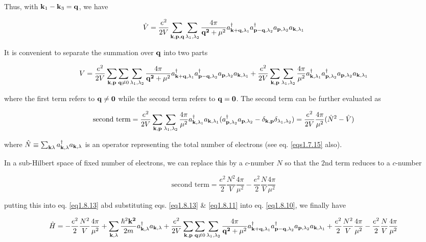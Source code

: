 Thus, with ${\bf k}_1 - {\bf k}_3 = \bf q$, we have

\begin{align}
\hat{V}=\frac{e^2}{2V}\sum_{\bf k,p,q}\sum_{\lambda_1,\lambda_2}\frac{4\pi}{{\bf q^2}+\mu^2}a^\dagger_{{\bf k+q},\lambda_1}a^\dagger_{{\bf p-q},\lambda_2}a_{{\bf p},\lambda_2}a_{{\bf k},\lambda_1}
\end{align}

It is convenient to separate the summation over $\bf q$ into two parts

\begin{align}\label{eq1.8.13}
V=\frac{e^2}{2V}\sum_{\bf k,p}\sum_{{\bf q}\neq0}\sum_{\lambda_1,\lambda_2}\frac{4\pi}{{\bf q^2}+\mu^2}a^\dagger_{{\bf k+q},\lambda_1}a^\dagger_{{\bf p-q},\lambda_2}a_{{\bf p},\lambda_2}a_{{\bf k},\lambda_1} + \frac{e^2}{2V}\sum_{\bf k,p}\sum_{\lambda_1,\lambda_2}\frac{4\pi}{\mu^2}a^\dagger_{{\bf k},\lambda_1}a^\dagger_{{\bf p},\lambda_2}a_{{\bf p},\lambda_2}a_{{\bf k},\lambda_1}
\end{align}

where the first term refers to $\bf q\neq0$ while the second term refers to $\bf q=0$. The second term can be further evaluated as 

\[\text{second term}= \frac{e^2}{2V}\sum_{\bf k,p}\sum_{\lambda_1,\lambda_2}\frac{4\pi}{\mu^2}a^\dagger_{{\bf k},\lambda_1}a_{{\bf k},\lambda_1}(a^\dagger_{{\bf p},\lambda_2}a_{{\bf p},\lambda_2}-\delta_{\bf k,p}\delta_{\lambda_1,\lambda_2}) = \frac{e^2}{2V}\frac{4\pi}{\mu^2}(\hat{N}^2-\hat{V})\]

where $\hat{N}\equiv\sum_{{\bf k}\lambda}a_{{\bf k},\lambda}^\dagger a_{{\bf k},\lambda}$ is an operator representing the total number of electrons (see eq. \eqref{eqs1.7.15} also). 

In a sub-Hilbert space of fixed number of electrons, we can replace this by a $c$-number $N$ so that the $2$nd term reduces to a $c$-number

\[\text{second term}=\frac{e^2}{2}\frac{N^2}{V}\frac{4\pi}{\mu^2}-\frac{e^2}{2}\frac{N}{V}\frac{4\pi}{\mu^2}\]

putting this into eq. \eqref{eq1.8.13} abd substituting eqs. \eqref{eq1.8.13} \& \eqref{eq1.8.11} into eq. \eqref{eq1.8.10}, we finally have

\[\hat{H}=-\frac{e^2}{2}\frac{N^2}{V}\frac{4\pi}{\mu^2}+\sum_{{\bf k},\lambda}\frac{\hbar^2\bf k^2}{2m}a^\dagger_{{\bf k},\lambda}a_{{\bf k},\lambda}+\frac{e^2}{2V}\sum_{\bf k,p} \sum_{{\bf q}\neq0}\sum_{\lambda_1,\lambda_2}\frac{4\pi}{{\bf q^2}+\mu^2}a^\dagger_{{\bf k+q},\lambda_1}a^\dagger_{{\bf p-q},\lambda_2}a_{{\bf p},\lambda_2}a_{{\bf k},\lambda_1} + \frac{e^2}{2}\frac{N^2}{V}\frac{4\pi}{\mu^2}-\frac{e^2}{2}\frac{N}{V}\frac{4\pi}{\mu^2} \]

